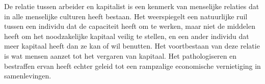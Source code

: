De relatie tussen arbeider en kapitalist is een kenmerk van menselijke
relaties dat in alle menselijke culturen heeft bestaan. Het weerspiegelt
een natuurlijke ruil tussen een individu dat de capaciteit heeft
om te werken, maar niet de middelen heeft om het noodzakelijke kapitaal
veilig te stellen, en een ander individu dat meer kapitaal heeft dan ze
kan of wil benutten. Het voortbestaan van deze relatie is wat mensen
aanzet tot het vergaren van kapitaal. Het pathologiseren en bestraffen
ervan heeft echter geleid tot een rampzalige economische vernietiging in
samenlevingen.
